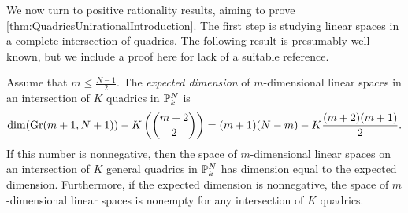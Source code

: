 We now turn to positive rationality results, aiming to prove \cref{thm:QuadricsUnirationalIntroduction}. The first step is studying linear spaces in a complete intersection of quadrics. The following result is presumably well known,    but we include a proof here for lack of a suitable reference.
\begin{lemma}
\label{lem:ExpectedLinearSpaceQuadrics}
Assume that $m \leq \frac{N-1}{2}$. The \emph{expected dimension} of $m$-dimensional linear spaces in an intersection of $K$ quadrics in $\P_k^N$ is 
\[\dim(\Gr(m+1,N+1)) - K\left(\binom{m+2}{2} \right) = (m+1)(N-m) - K\frac{(m+2)(m+1)}{2}. \]
If this number is nonnegative, then the space of $m$-dimensional linear spaces on an intersection of $K$ general quadrics in $\P_k^N$ has dimension equal to the expected dimension. Furthermore, if the expected dimension is nonnegative, the space of $m$-dimensional linear spaces is nonempty for any intersection of $K$ quadrics.
\end{lemma}
